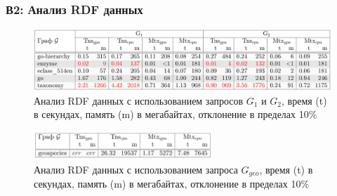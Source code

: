 \documentclass[aspectratio=169,xcolor=table,english]{beamer}
\begin{document}
\begin{frame}[fragile] \frametitle{В2: Анализ RDF данных}
    \begin{center}
     \begin{minipage}[m]{0.9\linewidth}
        \begin{figure}
            \centering
            \includegraphics[width=1.0\textwidth]{figures/results_1_rq2.png}
            \caption{Анализ RDF данных с использованием запросов $G_1$ и $G_2$, время (t) в секундах, память (m) в мегабайтах, отклонение в пределах 10\%}
        \end{figure}
    \end{minipage}\hfill   
    \pause
    \begin{minipage}[m]{0.9\linewidth}
        \begin{figure}
            \centering
            \includegraphics[width=0.6\textwidth]{figures/results_2_rq2.png}
            \caption{Анализ RDF данных с использованием запроса $G_{geo}$, время (t) в секундах, память (m) в мегабайтах, отклонение в пределах 10\%}
        \end{figure}
    \end{minipage}
    \end{center}
\end{frame}
\end{document}
